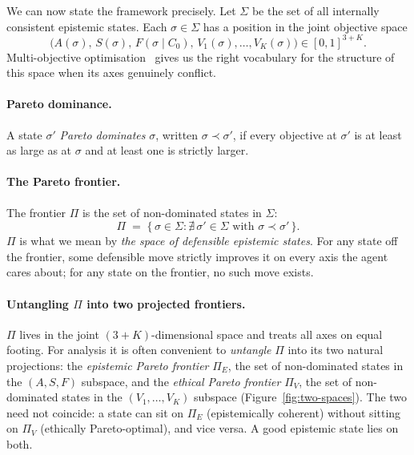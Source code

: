 \documentclass{article}
\begin{document}
We can now state the framework precisely. Let $\Sigma$ be the set of all
internally consistent epistemic states. Each $\sigma \in \Sigma$ has a
position in the joint objective space
\[
  \bigl(A(\sigma),\, S(\sigma),\, F(\sigma \mid C_0),\, V_1(\sigma), \dots, V_K(\sigma)\bigr)
  \in [0,1]^{3+K}.
\]
Multi-objective optimisation~\citep{deb2001multiobjective} gives us the right
vocabulary for the structure of this space when its axes genuinely conflict.

\paragraph{Pareto dominance.} A state $\sigma'$ \emph{Pareto dominates}
$\sigma$, written $\sigma \prec \sigma'$, if every objective at $\sigma'$ is
at least as large as at $\sigma$ and at least one is strictly larger.

\paragraph{The Pareto frontier.} The frontier $\Pi$ is the set of
non-dominated states in $\Sigma$:
\[
  \Pi \;=\; \{\,\sigma \in \Sigma : \nexists\, \sigma' \in \Sigma
                \text{ with } \sigma \prec \sigma'\,\}.
\]
$\Pi$ is what we mean by \emph{the space of defensible epistemic states}.
For any state off the frontier, some defensible move strictly improves it
on every axis the agent cares about; for any state on the frontier, no such
move exists.

\paragraph{Untangling $\Pi$ into two projected frontiers.}
$\Pi$ lives in the joint $(3 + K)$-dimensional space and treats all axes
on equal footing. For analysis it is often convenient to \emph{untangle}
$\Pi$ into its two natural projections: the \emph{epistemic Pareto
frontier} $\Pi_E$, the set of non-dominated states in the $(A, S, F)$
subspace, and the \emph{ethical Pareto frontier} $\Pi_V$, the set of
non-dominated states in the $(V_1, \dots, V_K)$ subspace
(Figure~\ref{fig:two-spaces}). The two need not coincide: a state can sit
on $\Pi_E$ (epistemically coherent) without sitting on $\Pi_V$ (ethically
Pareto-optimal), and vice versa. A good epistemic state lies on both.
\end{document}
